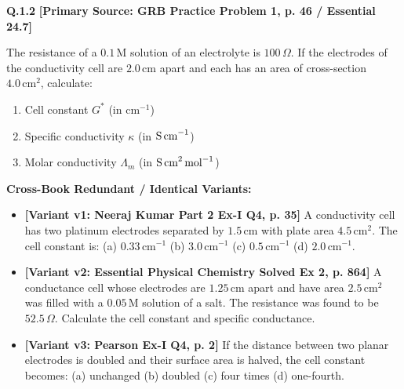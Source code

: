 \begin{problembox}
\textbf{Q.1.2} \hfill \textbf{[Primary Source: GRB Practice Problem 1, p. 46 / Essential  24.7]}
\label{q:qb-c1-02}

The resistance of a $0.1\,\text{M}$ solution of an electrolyte is $100\,\Omega$. If the electrodes of the conductivity cell are $2.0\,\text{cm}$ apart and each has an area of cross-section $4.0\,\text{cm}^2$, calculate:
\begin{enumerate}[label=(\alph*)]
    \item Cell constant $G^*$ (in $\text{cm}^{-1}$)
    \item Specific conductivity $\kappa$ (in $\text{S\,cm}^{-1}$)
    \item Molar conductivity $\Lambda_m$ (in $\text{S\,cm}^2\,\text{mol}^{-1}$)
\end{enumerate}

\tcbline
\textbf{\color{accentamber}Cross-Book Redundant / Identical Variants:}
\begin{itemize}[leftmargin=*,itemsep=2pt]
    \item \textbf{[Variant v1: Neeraj Kumar Part 2 Ex-I Q4, p. 35]} A conductivity cell has two platinum electrodes separated by $1.5\,\text{cm}$ with plate area $4.5\,\text{cm}^2$. The cell constant is: (a) $0.33\,\text{cm}^{-1}$ (b) $3.0\,\text{cm}^{-1}$ (c) $0.5\,\text{cm}^{-1}$ (d) $2.0\,\text{cm}^{-1}$.
    \item \textbf{[Variant v2: Essential Physical Chemistry Solved Ex 2, p. 864]} A conductance cell whose electrodes are $1.25\,\text{cm}$ apart and have area $2.5\,\text{cm}^2$ was filled with a $0.05\,\text{M}$ solution of a salt. The resistance was found to be $52.5\,\Omega$. Calculate the cell constant and specific conductance.
    \item \textbf{[Variant v3: Pearson Ex-I Q4, p. 2]} If the distance between two planar electrodes is doubled and their surface area is halved, the cell constant becomes: (a) unchanged (b) doubled (c) four times (d) one-fourth.
\end{itemize}
\end{problembox}

